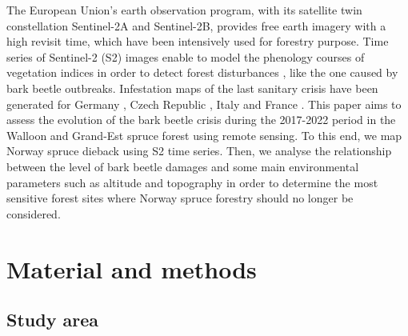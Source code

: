 \documentclass[3p,procedia]{elsarticle}
\begin{document}
The European Union’s earth observation program, with its satellite twin constellation Sentinel-2A and Sentinel-2B, provides free earth imagery with a high revisit time, which have been intensively used for forestry purpose. 
Time series of Sentinel-2 (S2) images enable to model the phenology courses of vegetation indices in order to detect forest disturbances \citep{low_phenology_2020}, like the one caused by bark beetle outbreaks.
Infestation maps of the last sanitary crisis have been generated for Germany \citep{ali_canopy_2021,thonfeld_first_2022}, Czech Republic \citep{barta_early_2021}, Italy \citep{dalponte_mapping_2022} and France \citep{nardi_drought_2022}. 
This paper aims to assess the evolution of the bark beetle crisis during the 2017-2022 period in the Walloon and Grand-Est spruce forest using remote sensing.
To this end, we map Norway spruce dieback using S2 time series.
Then, we analyse the relationship between the level of bark beetle damages and some main environmental parameters such as altitude and topography in order to determine the most sensitive forest sites where Norway spruce forestry should no longer be considered.


\section{Material and methods}
\subsection{Study area}
\end{document}
